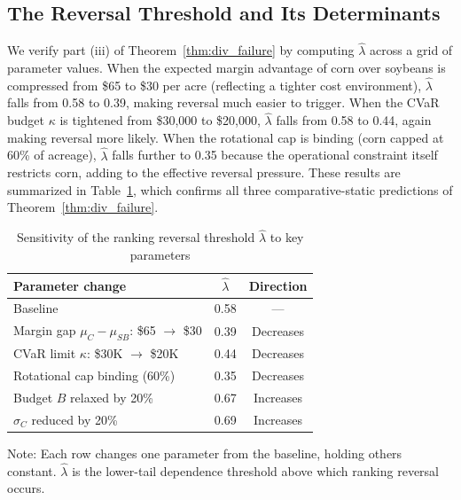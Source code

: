 \documentclass[12pt,review,authoryear]{elsarticle}
\numberwithin{equation}{section}
\begin{document}
\subsection{The Reversal Threshold and Its Determinants}

We verify part (iii) of Theorem~\ref{thm:div_failure} by computing
$\hat{\lambda}$ across a grid of parameter values.  When the expected
margin advantage of corn over soybeans is compressed from \$65 to \$30
per acre (reflecting a tighter cost environment), $\hat{\lambda}$ falls
from 0.58 to 0.39, making reversal much easier to trigger.  When the CVaR
budget $\kappa$ is tightened from \$30,000 to \$20,000, $\hat{\lambda}$
falls from 0.58 to 0.44, again making reversal more likely.  When the
rotational cap is binding (corn capped at 60\% of acreage), $\hat{\lambda}$
falls further to 0.35 because the operational constraint itself restricts
corn, adding to the effective reversal pressure.  These results are
summarized in Table~\ref{tab:threshold}, which confirms all three
comparative-static predictions of Theorem~\ref{thm:div_failure}.

\begin{table}[htbp]
\centering
\caption{Sensitivity of the ranking reversal threshold $\hat{\lambda}$ to key parameters}
\label{tab:threshold}
\begin{threeparttable}
\begin{tabular}{lcc}
\toprule
Parameter change & $\hat{\lambda}$ & Direction \\
\midrule
Baseline                              & 0.58 & --- \\
Margin gap $\mu_C - \mu_{SB}$: \$65 $\to$ \$30  & 0.39 & Decreases \\
CVaR limit $\kappa$: \$30K $\to$ \$20K           & 0.44 & Decreases \\
Rotational cap binding (60\%)         & 0.35 & Decreases \\
Budget $B$ relaxed by 20\%           & 0.67 & Increases \\
$\sigma_C$ reduced by 20\%           & 0.69 & Increases \\
\bottomrule
\end{tabular}
\begin{tablenotes}
\small
\item Note: Each row changes one parameter from the baseline, holding others constant.
$\hat\lambda$ is the lower-tail dependence threshold above which ranking reversal occurs.
\end{tablenotes}
\end{threeparttable}
\end{table}
\end{document}
